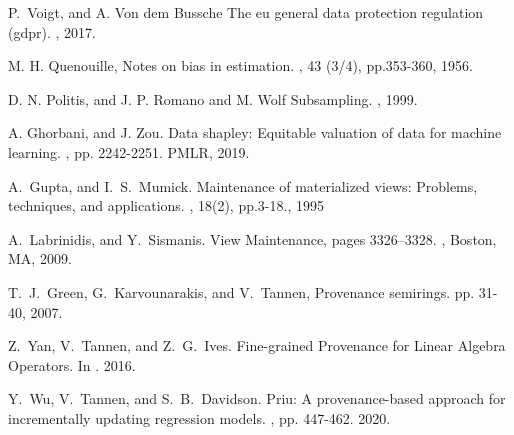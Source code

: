\documentclass[11pt]{article}
\begin{document}
% 
% 

\begin{thebibliography}{10}
\itemsep=1pt
\begin{small}

 P.~Voigt, and A. Von dem Bussche
\newblock The eu general data protection regulation (gdpr). , 2017.

 M. H. Quenouille, 
\newblock Notes on bias in estimation. , 43 (3/4), pp.353-360, 1956.

 D. N. Politis, and J. P. Romano and M. Wolf 
\newblock Subsampling. , 1999.

 A. Ghorbani, and J. Zou. \newblock Data shapley: Equitable valuation of data for machine learning. , pp. 2242-2251. PMLR, 2019.

 A.~Gupta, and I.~S.~Mumick. \newblock Maintenance of materialized views: Problems, techniques, and applications. , 18(2), pp.3-18., 1995

 A.~Labrinidis, and Y.~Sismanis. \newblock View Maintenance, pages 3326–3328. , Boston, MA, 2009.


 T.~J.~Green, G.~Karvounarakis, and V.~Tannen,  \newblock Provenance semirings.  pp. 31-40, 2007.

 Z.~Yan, V.~Tannen, and Z.~G.~Ives. \newblock Fine-grained Provenance for Linear Algebra Operators. In . 2016.

 Y.~Wu, V.~Tannen, and S.~B.~Davidson. \newblock Priu: A provenance-based approach for incrementally updating regression models. , pp. 447-462. 2020.


\end{small}
\end{thebibliography}
\end{document}
